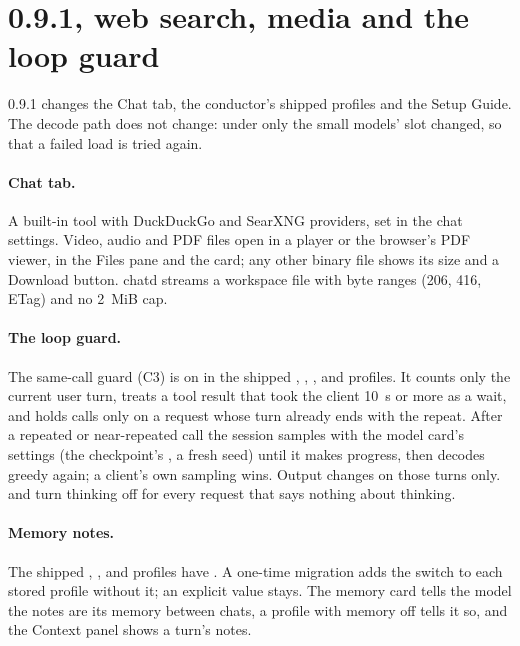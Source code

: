 \section{0.9.1, web search, media and the loop guard}\label{sec:changelog-091}

0.9.1 changes the Chat tab, the conductor's shipped profiles and the Setup Guide. The decode path does not change: under  only the small models' slot changed, so that a failed load is tried again.

\paragraph{Chat tab.} A built-in  tool with DuckDuckGo and SearXNG providers, set in the chat settings. Video, audio and PDF files open in a player or the browser's PDF viewer, in the Files pane and the  card; any other binary file shows its size and a Download button. chatd streams a workspace file with byte ranges (206, 416, ETag) and no 2~MiB cap.

\paragraph{The loop guard.} The same-call guard (C3) is on in the shipped , , ,  and  profiles. It counts only the current user turn, treats a tool result that took the client 10~s or more as a wait, and holds calls only on a request whose turn already ends with the repeat. After a repeated or near-repeated call the session samples with the model card's settings (the checkpoint's , a fresh seed) until it makes progress, then decodes greedy again; a client's own sampling wins. Output changes on those turns only.  and  turn thinking off for every request that says nothing about thinking.

\paragraph{Memory notes.} The shipped , ,  and  profiles have . A one-time migration adds the switch to each stored profile without it; an explicit value stays. The memory card tells the model the notes are its memory between chats, a profile with memory off tells it so, and the Context panel shows a turn's notes.

